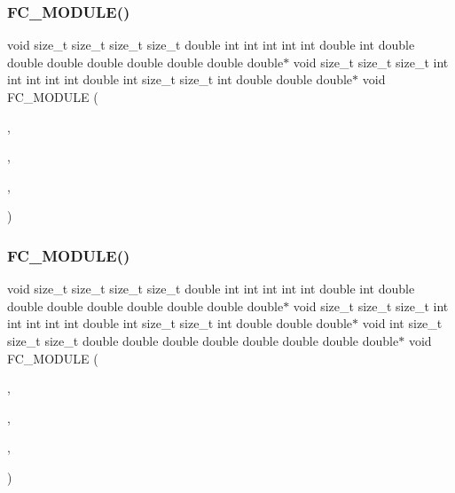 \subsubsection{\texorpdfstring{F\+C\+\_\+\+M\+O\+D\+U\+L\+E()}{FC\_MODULE()}\hspace{0.1cm}{\footnotesize\ttfamily [5/6]}}
{\footnotesize\ttfamily void size\+\_\+t size\+\_\+t size\+\_\+t size\+\_\+t double int int int int int double int double double double double double double double double$\ast$ void size\+\_\+t size\+\_\+t size\+\_\+t int int int int int double int size\+\_\+t size\+\_\+t int double double double$\ast$ void F\+C\+\_\+\+M\+O\+D\+U\+LE (\begin{DoxyParamCaption}\item[{euler}]{,  }\item[{uniformflux}]{,  }\item[{E\+U\+L\+ER}]{,  }\item[{U\+N\+I\+F\+O\+R\+M\+F\+L\+UX}]{ }\end{DoxyParamCaption})}

\hypertarget{EulerKernels_8H_a76304b605c9fd388cb9b1e752199a9d2}{}\label{EulerKernels_8H_a76304b605c9fd388cb9b1e752199a9d2} 
\subsubsection{\texorpdfstring{F\+C\+\_\+\+M\+O\+D\+U\+L\+E()}{FC\_MODULE()}\hspace{0.1cm}{\footnotesize\ttfamily [6/6]}}
{\footnotesize\ttfamily void size\+\_\+t size\+\_\+t size\+\_\+t size\+\_\+t double int int int int int double int double double double double double double double double$\ast$ void size\+\_\+t size\+\_\+t size\+\_\+t int int int int int double int size\+\_\+t size\+\_\+t int double double double$\ast$ void int size\+\_\+t size\+\_\+t size\+\_\+t double double double double double double double double$\ast$ void F\+C\+\_\+\+M\+O\+D\+U\+LE (\begin{DoxyParamCaption}\item[{euler}]{,  }\item[{uniformscalarflux}]{,  }\item[{E\+U\+L\+ER}]{,  }\item[{U\+N\+I\+F\+O\+R\+M\+E\+U\+L\+E\+R\+F\+L\+UX}]{ }\end{DoxyParamCaption})}



